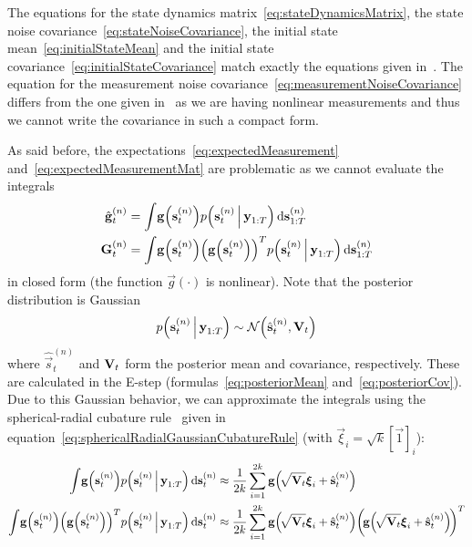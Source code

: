 	The equations for the state dynamics matrix~\eqref{eq:stateDynamicsMatrix}, the state noise covariance~\eqref{eq:stateNoiseCovariance}, the initial state mean~\eqref{eq:initialStateMean} and the initial state covariance~\eqref{eq:initialStateCovariance} match exactly the equations given in~\cite{ghahramaniParameterEstimationLinear1996}. The equation for the measurement noise covariance~\eqref{eq:measurementNoiseCovariance} differs from the one given in~\cite{ghahramaniParameterEstimationLinear1996} as we are having nonlinear measurements and thus we cannot write the covariance in such a compact form.

	As said before, the expectations~\eqref{eq:expectedMeasurement} and~\eqref{eq:expectedMeasurementMat} are problematic as we cannot evaluate the integrals
	\begin{align*}
		\hat{\boldsymbol{\mathrm{g}}}_t^{(n)} &= \int\! \boldsymbol{\mathrm{g}}\Big(\boldsymbol{\mathrm{s}}_t^{(n)}\Big) p\Big(\boldsymbol{\mathrm{s}}_t^{(n)} \,\Big\vert\, \boldsymbol{\mathrm{y}}_{1:T}\Big) \dd{\boldsymbol{\mathrm{s}}_{1:T}^{(n)}} \\
		\boldsymbol{\mathrm{G}}_t^{(n)}       &= \int\! \boldsymbol{\mathrm{g}}\Big(\boldsymbol{\mathrm{s}}_t^{(n)}\Big) \Big(\boldsymbol{\mathrm{g}}\Big(\boldsymbol{\mathrm{s}}_t^{(n)}\Big)\Big)^T p\Big(\boldsymbol{\mathrm{s}}_t^{(n)} \,\Big\vert\, \boldsymbol{\mathrm{y}}_{1:T} \Big) \dd{\boldsymbol{\mathrm{s}}_{1:T}^{(n)}}
	\end{align*}
	in closed form (the function \( \vec{g}(\cdot) \) is nonlinear). Note that the posterior distribution is Gaussian
	\begin{equation*}
		p\Big(\boldsymbol{\mathrm{s}}_t^{(n)} \,\Big\vert\, \boldsymbol{\mathrm{y}}_{1:T}\Big) \sim \mathcal{N}\Big(\hat{\boldsymbol{\mathrm{s}}}_{t}^{(n)}, \boldsymbol{\mathrm{V}}_{t}\Big)
	\end{equation*}
	where \( \hat{\vec{s}}_{t}^{(n)} \) and \( \boldsymbol{\mathrm{V}}_{t} \) form the posterior mean and covariance, respectively. These are calculated in the E-step (formulas~\eqref{eq:posteriorMean} and~\eqref{eq:posteriorCov}). Due to this Gaussian behavior, we can approximate the integrals using the spherical-radial cubature rule~\cite{solinCubatureIntegrationMethods2010} given in equation~\eqref{eq:sphericalRadialGaussianCubatureRule} (with \( \vec{\xi}_i = \sqrt{k} [\vec{1}]_i \)):
	\begin{align}
		\int\! \boldsymbol{\mathrm{g}}\Big(\boldsymbol{\mathrm{s}}_t^{(n)}\Big) p\Big(\boldsymbol{\mathrm{s}}_t^{(n)} \,\Big\vert\, \boldsymbol{\mathrm{y}}_{1:T}\Big) \dd{\boldsymbol{\mathrm{s}}_t^{(n)}}
			&\approx \frac{1}{2k} \sum_{i = 1}^{2k} \boldsymbol{\mathrm{g}}\Big(\!\sqrt{\boldsymbol{\mathrm{V}}_t} \boldsymbol{\mathrm{\xi}}_i + \hat{\boldsymbol{\mathrm{s}}}_t^{(n)}\Big)  \label{eq:lgsCubatureG} \\
		\int\! \boldsymbol{\mathrm{g}}\Big(\boldsymbol{\mathrm{s}}_t^{(n)}\Big) \Big(\boldsymbol{\mathrm{g}}\Big(\boldsymbol{\mathrm{s}}_t^{(n)}\Big)\Big)^T p\Big(\boldsymbol{\mathrm{s}}_t^{(n)} \,\Big\vert\, \boldsymbol{\mathrm{y}}_{1:T} \Big) \dd{\boldsymbol{\mathrm{s}}_t^{(n)}}
			&\approx \frac{1}{2k} \sum_{i = 1}^{2k} \boldsymbol{\mathrm{g}}\Big(\!\sqrt{\boldsymbol{\mathrm{V}}_t} \boldsymbol{\mathrm{\xi}}_i + \hat{\boldsymbol{\mathrm{s}}}_t^{(n)}\Big) \bigg(\!\boldsymbol{\mathrm{g}}\Big(\!\sqrt{\boldsymbol{\mathrm{V}}_t} \boldsymbol{\mathrm{\xi}}_i + \hat{\boldsymbol{\mathrm{s}}}_t^{(n)}\Big)\!\bigg)^T  \label{eq:lgsCubatureGG}
	\end{align}
